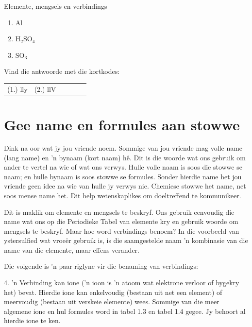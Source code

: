 \begin{exercises}{Elemente, mengsels en verbindings}
{\begin{enumerate}[noitemsep, label=\textbf{\arabic*}. ]
\begin{enumerate}[noitemsep, label=\textbf{\alph*}. ]
\label{m38708*uid32}\item $\text{Al}$
\label{m38708*uid33}\item $\text{H}{}_{2}\text{SO}{}_{4}$
\label{m38708*uid34}\item $\text{SO}{}_{3}$\end{enumerate}
                \end{enumerate}
    \label{m38708*cid4}
\par {} Vind die antwoorde met die kortkodes:
 \par \begin{tabular}[h]{cccccc}
 (1.) lly  &  (2.) llV  & \end{tabular}}
\end{exercises}
            \section{Gee name en formules aan stowwe}
            \nopagebreak
      \label{m38708*eip-379}Dink na oor wat jy jou vriende noem. Sommige van jou vriende mag volle name (lang name) en 'n bynaam (kort naam) hê. Dit is die woorde wat ons gebruik om ander te vertel na wie of wat ons verwys. Hulle volle naam is soos die stowwe se naam; en hulle bynaam is soos stowwe se formules. Sonder hierdie name het jou vriende geen idee na wie van hulle jy verwys nie. Chemiese stowwe het name, net soos mense name het. Dit help wetenskaplikes om doeltreffend te kommunikeer. 
     \par \label{m38708*id64028}Dit is maklik om elemente en mengsels te beskryf. Ons gebruik eenvoudig die name wat ons op die Periodieke Tabel van elemente kry en gebruik woorde om mengsels te beskryf. Maar hoe word verbindings benoem? In die voorbeeld van ystersulfied wat vroeër gebruik is, is die saamgestelde naam 'n kombinasie van die name van die elemente, maar effens verander. \par 
      \label{m38708*id64033}Die volgende is 'n paar riglyne vir die benaming van verbindings:\par 


4. 'n Verbinding kan ione ('n ioon is 'n atoom wat elektrone verloor of bygekry het) bevat. Hierdie ione kan enkelvoudig (bestaan uit net een element) of meervoudig (bestaan uit verskeie elemente) wees. Sommige van die meer algemene ione en hul formules word in tabel 1.3 en tabel 1.4 gegee. Jy behoort al hierdie ione te ken.

